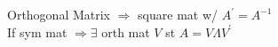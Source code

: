 \documentclass[10pt,landscape]{article}
\begin{document}
\raggedright
\footnotesize
\begin{multicols*}{4}
\setlength{\premulticols}{1pt}
\setlength{\postmulticols}{1pt}
\setlength{\multicolsep}{1pt}
\setlength{\columnsep}{2pt}

\setlength{\columnseprule}{.25pt}
\setlength{\premulticols}{.25pt}
\setlength{\postmulticols}{.25pt}
\setlength{\multicolsep}{.25pt}
\setlength{\columnsep}{.25pt}
Orthogonal Matrix $\Rightarrow$ square mat w/ $A^{\prime}=A^{-1}$\\
If sym mat $\Rightarrow  \exists$ orth mat $V$ st $A=V\Lambda V^{\prime}$\\

\end{multicols*} 
\end{document}
